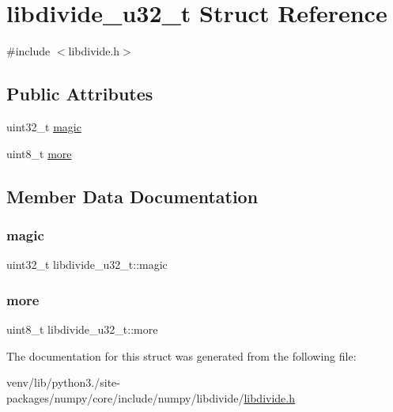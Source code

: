 \hypertarget{structlibdivide__u32__t}{}\section{libdivide\+\_\+u32\+\_\+t Struct Reference}
\label{structlibdivide__u32__t}


{\ttfamily \#include $<$libdivide.\+h$>$}

\subsection*{Public Attributes}
\begin{DoxyCompactItemize}
\item 
uint32\+\_\+t \hyperlink{structlibdivide__u32__t_a94420c6b723dd50d9ee89e5c3f45f012}{magic}
\item 
uint8\+\_\+t \hyperlink{structlibdivide__u32__t_a933f89343bfc98f2788a2a4f88bb1967}{more}
\end{DoxyCompactItemize}


\subsection{Member Data Documentation}
\mbox{\label{structlibdivide__u32__t_a94420c6b723dd50d9ee89e5c3f45f012}} 
\subsubsection{\texorpdfstring{magic}{magic}}
{\footnotesize\ttfamily uint32\+\_\+t libdivide\+\_\+u32\+\_\+t\+::magic}

\mbox{\label{structlibdivide__u32__t_a933f89343bfc98f2788a2a4f88bb1967}} 
\subsubsection{\texorpdfstring{more}{more}}
{\footnotesize\ttfamily uint8\+\_\+t libdivide\+\_\+u32\+\_\+t\+::more}



The documentation for this struct was generated from the following file\+:\begin{DoxyCompactItemize}
\item 
venv/lib/python3./site-\/packages/numpy/core/include/numpy/libdivide/\hyperlink{libdivide_8h}{libdivide.\+h}\end{DoxyCompactItemize}
